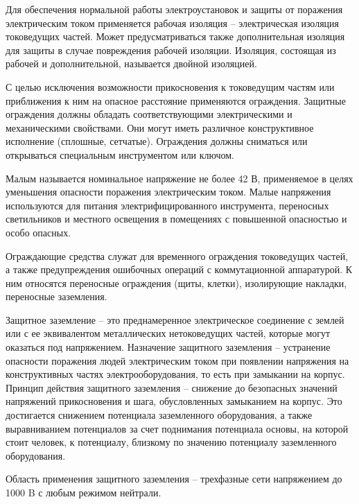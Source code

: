        Для обеспечения нормальной работы электроустановок и защиты от
        поражения электрическим током применяется рабочая изоляция –
        электрическая изоляция токоведущих частей. Может предусматриваться
        также дополнительная изоляция для защиты в случае повреждения рабочей
        изоляции. Изоляция, состоящая из рабочей и дополнительной, называется
        двойной изоляцией.

        С целью исключения возможности прикосновения к токоведущим частям или
        приближения к ним на опасное расстояние применяются ограждения.
        Защитные ограждения должны обладать соответствующими электрическими и
        механическими свойствами. Они могут иметь различное конструктивное
        исполнение (сплошные, сетчатые). Ограждения должны сниматься или
        открываться специальным инструментом или ключом.

        Малым называется номинальное напряжение не более 42 В, применяемое в
        целях уменьшения опасности поражения электрическим током. Малые
        напряжения используются для питания электрифицированного инструмента,
        переносных светильников и местного освещения в помещениях с повышенной
        опасностью и особо опасных.

        Ограждающие средства служат для временного ограждения токоведущих
        частей, а также предупреждения ошибочных операций с коммутационной
        аппаратурой. К ним относятся переносные ограждения (щиты, клетки),
        изолирующие накладки, переносные заземления.

        Защитное заземление – это преднамеренное электрическое соединение с
        землей или с ее эквивалентом металлических нетоковедущих частей,
        которые могут оказаться под напряжением. Назначение защитного
        заземления – устранение опасности поражения людей электрическим током
        при появлении напряжения на конструктивных частях электрооборудования,
        то есть при замыкании на корпус.  Принцип действия защитного заземления
        – снижение до безопасных значений напряжений прикосновения и шага,
        обусловленных замыканием  на  корпус.  Это достигается  снижением
        потенциала заземленного оборудования, а также выравниванием потенциалов
        за счет поднимания потенциала основы, на которой стоит человек, к
        потенциалу, близкому по значению  потенциалу заземленного оборудования.

        Область применения защитного заземления – трехфазные сети напряжением
        до  1000 B с любым режимом нейтрали.

